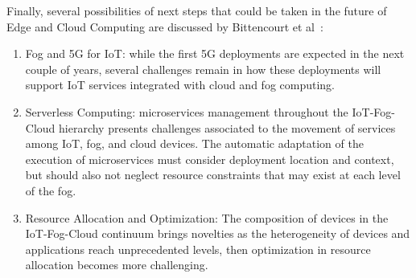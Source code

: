 Finally, several possibilities of next steps that could be taken in the future of Edge and Cloud Computing are discussed by Bittencourt et al~\cite{iot_fog_cloud}: 
\begin{enumerate}

    \item Fog and 5G for IoT: while the first 5G deployments are expected in the next couple of years, several challenges remain in how these deployments will support IoT services integrated with cloud and fog computing.
    \item Serverless Computing: microservices management throughout the IoT-Fog-Cloud hierarchy presents challenges associated to the movement of services among IoT, fog, and cloud devices. The automatic adaptation of the execution of microservices must consider deployment location and context, but should also not neglect resource constraints that may exist at each level of the fog.
    
    \item Resource Allocation and Optimization: The composition of devices in the IoT-Fog-Cloud continuum brings novelties as the heterogeneity of devices and applications reach unprecedented levels, then optimization in resource allocation becomes more challenging. 
    

\end{enumerate}
